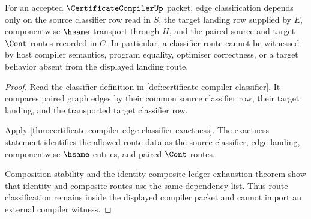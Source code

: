 \begin{theorem}
\label{thm:certificate-compiler-classifier-route-scope}
For an accepted $\CertificateCompilerUp$ packet, edge classification depends
only on the source classifier row read in $S$, the target landing row supplied
by $E$, componentwise $\hsame$ transport through $H$, and the paired source
and target $\Cont$ routes recorded in $C$. In particular, a classifier route
cannot be witnessed by host compiler semantics, program equality, optimiser
correctness, or a target behavior absent from the displayed landing route.
\end{theorem}
\begin{proof}
Read the classifier definition in
\autoref{def:certificate-compiler-classifier}. It compares paired graph edges
by their common source classifier row, their target landing, and the
transported target classifier row.

Apply \autoref{thm:certificate-compiler-edge-classifier-exactness}. The
exactness statement identifies the allowed route data as the source
classifier, edge landing, componentwise $\hsame$ entries, and paired
$\Cont$ routes.

Composition stability and the identity-composite ledger exhaustion theorem
show that identity and composite routes use the same dependency list. Thus
route classification remains inside the displayed compiler packet and cannot
import an external compiler witness.
\end{proof}

